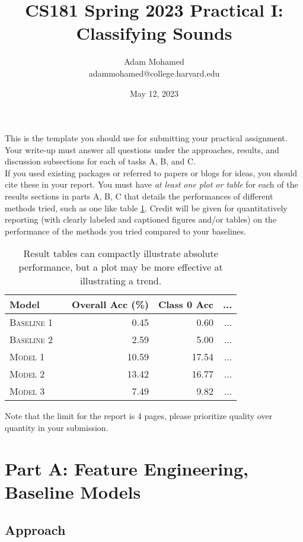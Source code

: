 \documentclass[11pt]{article}
\title{CS181 Spring 2023 Practical I: Classifying Sounds}
\author{Adam Mohamed \\ adammohamed@college.harvard.edu}
\date{May 12, 2023}
\begin{document}
\maketitle{}


\noindent This is the template you should use for submitting your practical assignment. 
Your write-up must
answer all questions under the approaches, results, and discussion subsections
for each of tasks A, B, and C. \\

\noindent If you used existing packages or referred to papers or blogs for ideas,  you should cite these in your report.  You must have \textit{at least one plot or table}
for each of the results sections in parts A, B, C
that details the performances of different methods tried, such as one like table \ref{tab:results}. Credit will be given for quantitatively reporting (with clearly
labeled and captioned figures and/or tables) on the performance of the
methods you tried compared to your baselines.\\

\begin{table}
\centering
\begin{tabular}{llrrr}
 \toprule
 Model &  & Overall Acc (\%) & Class 0 Acc & ... \\
 \midrule
 \textsc{Baseline 1} & & 0.45 & 0.60 & ...\\
 \textsc{Baseline 2} & & 2.59 & 5.00 & ... \\
 \textsc{Model 1} & & 10.59 & 17.54 & ... \\
 \textsc{Model 2} & &13.42 & 16.77 & ... \\
 \textsc{Model 3} & & 7.49 & 9.82 & ... \\
 \bottomrule
\end{tabular}
\caption{\label{tab:results} Result tables can compactly illustrate absolute performance, but a plot may be more effective at illustrating a trend.}
\end{table}


\noindent Note that the limit for the report is 4 pages, please prioritize quality over 
quantity in your submission.\\

\section{Part A: Feature Engineering, Baseline Models}

\subsection{Approach}
\end{document}
